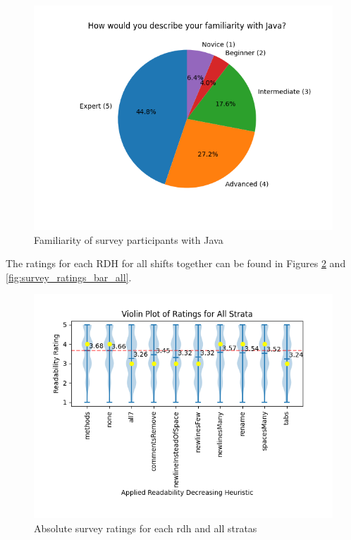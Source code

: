 \documentclass[%
class=scrreprt,
chapterprefix=false,%
open=right,%
twoside=false,%
paper=a4,%
logofile={Logo\_zentral\_farbig\_EN.png},%
thesistype=master,%
UKenglish,%
]{se2thesis}
\theoremstyle{definition}
\begin{document}
	\begin{figure}[t]
		\centering
		\includegraphics[width=\textwidth]{img/survey_java_familiarity_pie.png}
		\caption{Familiarity of survey participants with Java}
		\label{fig:survey_java_familiarity_pie}
	\end{figure}
	
	The ratings for each RDH for all shifts together can be found in Figures \ref{fig:survey_ratings_violin_all} and \ref{fig:survey_ratings_bar_all}.
	
	\begin{figure}[t]
		\centering
		\includegraphics[width=\textwidth]{img/survey_ratings_violin_all.png}
		\caption{Absolute survey ratings for each rdh and all stratas}
		\label{fig:survey_ratings_violin_all}
	\end{figure}
	
\end{document}
